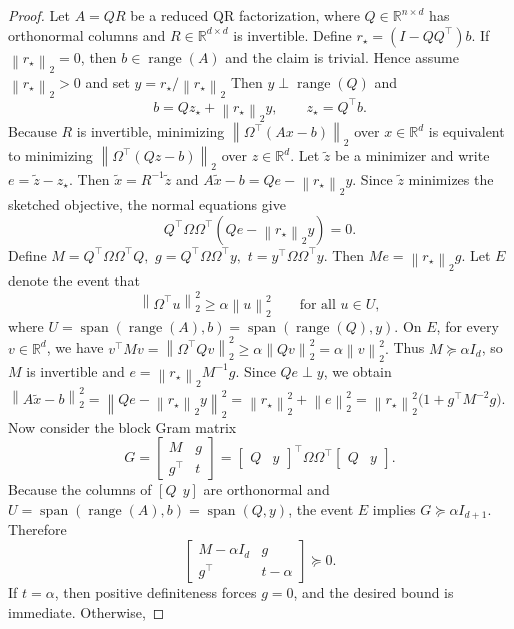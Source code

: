 \documentclass[10pt,a4paper]{amsart}
\newcommand{\R}{\mathbb{R}}
\newcommand{\norm}[1]{\left\lVert #1 \right\rVert}
\newcommand{\range}{\operatorname{range}}
\begin{document}
\begin{proof}
Let $A=QR$ be a reduced QR factorization, where $Q\in\R^{n\times d}$ has orthonormal
columns and $R\in\R^{d\times d}$ is invertible. Define
$
r_\star = (I-QQ^\top)b.
$
If $\norm{r_\star}_2=0$, then $b\in\range(A)$ and the claim is trivial. Hence assume $\norm{r_\star}_2>0$ and set
$
y = r_\star/\norm{r_\star}_2
$
Then $y\perp\range(Q)$ and
\[
b = Qz_\star + \norm{r_\star}_2 y,
\qquad
z_\star = Q^\top b.
\]
Because $R$ is invertible, minimizing $\norm{\Omega^\top(Ax-b)}_2$ over $x\in\R^d$ is
equivalent to minimizing
$
\norm{\Omega^\top(Qz-b)}_2
$
over $z\in\R^d$. Let $\widetilde z$ be a minimizer and write
$
e = \widetilde z-z_\star.
$
Then $\widetilde x = R^{-1}\widetilde z$ and
$
A\widetilde x-b = Qe-\norm{r_\star}_2 y.
$
Since $\widetilde z$ minimizes the sketched objective, the normal equations give
\[
Q^\top\Omega\Omega^\top(Qe-\norm{r_\star}_2 y)=0.
\]
Define
$
M = Q^\top\Omega\Omega^\top Q,$ 
$
g = Q^\top\Omega\Omega^\top y,$
$
t = y^\top\Omega\Omega^\top y.$
Then
$
Me = \norm{r_\star}_2 g.
$
Let $E$ denote the event that
\[
\norm{\Omega^\top u}_2^2 \ge \alpha\norm{u}_2^2
\qquad \text{for all } u\in U, 
\]
where $U = \operatorname{span}(\range(A),b) = \operatorname{span}(\range(Q),y)$.  On $E$, for every $v\in\R^d$, we have
$
v^\top Mv
=
\norm{\Omega^\top Qv}_2^2
\ge\alpha\norm{Qv}_2^2
=
\alpha\norm{v}_2^2.
$
Thus $M\succeq \alpha I_d$, so $M$ is invertible and
$
e = \norm{r_\star}_2 M^{-1}g.
$
Since $Qe\perp y$, we obtain
$
\norm{A\widetilde x-b}_2^2
=
\norm{Qe-\norm{r_\star}_2 y}_2^2
=
\norm{r_\star}_2^2+\norm{e}_2^2
=
\norm{r_\star}_2^2\bigl(1+g^\top M^{-2}g\bigr).
$
Now consider the block Gram matrix
\[
G =
\begin{bmatrix}
M & g\\
g^\top & t
\end{bmatrix}
=
\begin{bmatrix}Q & y\end{bmatrix}^\top
\Omega\Omega^\top
\begin{bmatrix}Q & y\end{bmatrix}.
\]
Because the columns of $[Q\ \ y]$ are orthonormal and $U=\operatorname{span}(\range(A),b)=\operatorname{span}(Q,y)$,
the event $E$ implies
$
G \succeq \alpha I_{d+1}.
$
Therefore
\[
\begin{bmatrix}
M- \alpha I_d & g\\
g^\top & t- \alpha 
\end{bmatrix}
\succeq 0.
\]
If $t= \alpha $, then positive definiteness forces $g=0$, and the desired bound is immediate. Otherwise,

\end{proof}
\end{document}
